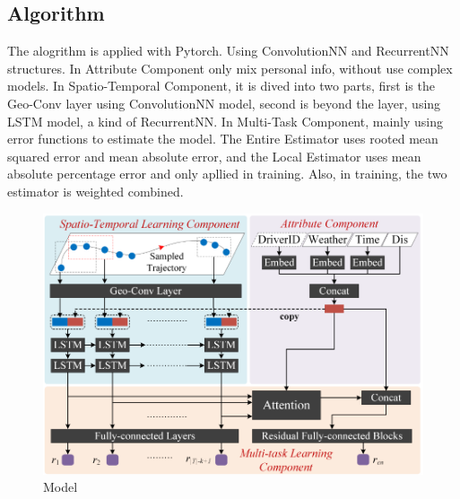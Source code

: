 \documentclass[fontset=none]{ctexart}
\theoremstyle{definition}
\theoremstyle{remark}
\begin{document}
\subsection{Algorithm}
The alogrithm is applied with Pytorch. Using ConvolutionNN and RecurrentNN structures.
In Attribute Component only mix personal info, without use complex models. In Spatio-Temporal Component, it is dived into two parts, first is the Geo-Conv layer using ConvolutionNN model, second is beyond the layer, using LSTM model, a kind of RecurrentNN. In Multi-Task Component, mainly using error functions to estimate the model. The Entire Estimator uses rooted mean squared error and mean absolute error, and the Local Estimator uses mean absolute percentage error and only apllied in training. Also, in training, the two estimator is weighted combined.
\begin{figure}[htb]
  \centering
  \includegraphics[width=\textwidth]{images/deepTTEstruct.png}
  \caption{Model}
  \label{fig: DeepTTEstuct}
\end{figure}
\end{document}
